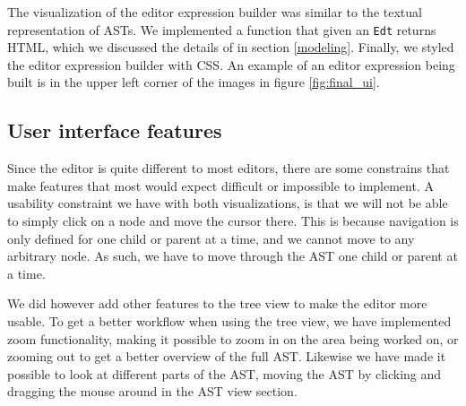 The visualization of the editor expression builder was similar to the textual
representation of ASTs. We implemented a function that given an \texttt{Edt}
returns HTML, which we discussed the details of in section \ref{modeling}.
Finally, we styled the editor expression builder with CSS. An example of an
editor expression being built is in the upper left corner of the images in
figure \ref{fig:final_ui}.

\subsection{User interface features}

Since the editor is quite different to most editors, there are some constrains
that make features that most would expect difficult or impossible to implement.
A usability constraint we have with both visualizations, is that we will not be
able to simply click on a node and move the cursor there. This is because
navigation is only defined for one child or parent at a time, and we cannot move
to any arbitrary node. As such, we have to move through the AST one child or
parent at a time.

We did however add other features to the tree view to make the editor more
usable. To get a better workflow when using the tree view, we have implemented
zoom functionality, making it possible to zoom in on the area being worked on,
or zooming out to get a better overview of the full AST. Likewise we
have made it possible to look at different parts of the AST, moving the AST by
clicking and dragging the mouse around in the AST view section.

